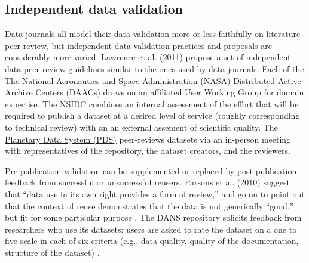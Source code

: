 \documentclass[10pt,a4paper,twocolumn]{article}
\begin{document}
{\subsection*{Independent data validation}

Data journals all model their data validation more or less faithfully on literature peer review, but independent data validation practices and proposals are considerably more varied.
Lawrence et al. (2011) propose a set of independent data peer review guidelines similar to the ones used by data journals\cite{lawrence_citation_2011}.
Each of the The National Aeronautics and Space Administration (NASA) Distributed Active Archive Centers (DAACs) draws on an affiliated User Working Group for domain expertise.
The NSIDC combines an internal assessment of the effort that will be required to publish a dataset at a desired level of service (roughly corresponding to technical review) with an an external assement of scientific quality.
The \href{https://pds.jpl.nasa.gov/}{Planetary Data System (PDS)} peer-reviews datasets via an in-person meeting with representatives of the repository, the dataset creators, and the reviewers.  

Pre-publication validation can be supplemented or replaced by post-publication feedback from successful or unsuccessful reusers.
Parsons et al. (2010) suggest that ``data use in its own right provides a form of review,'' and go on to point out that the context of reuse demonstrates that the data is not generically ``good,'' but fit for some particular purpose \cite{parsons_data_2010}.
The DANS repository solicits feedback from researchers who use its datasets: users are asked to rate the dataset on a one to five scale in each of six criteria (e.g., data quality, quality of the documentation, structure of the dataset) \cite{grootveld_data_2011,grootveld_peer-reviewed_2012}.

}
\end{document}

